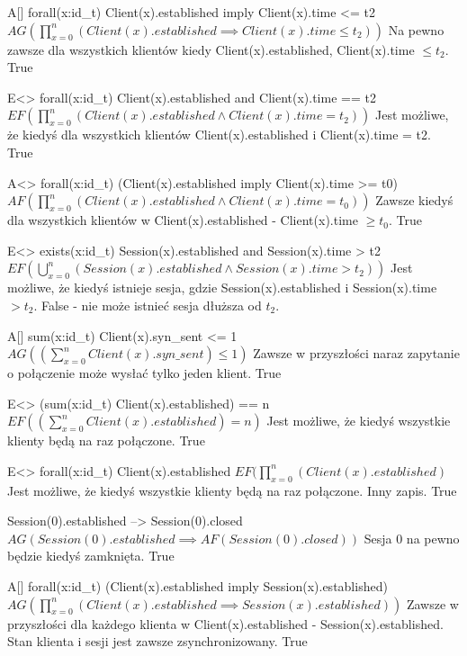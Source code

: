 \documentclass[12pt, a4paper]{article}
\begin{document}
\fm
{A[] forall(x:id\_t) Client(x).established imply Client(x).time <= t2}
{$AG(\prod\limits_{x=0}^n (Client(x).established \implies Client(x).time \le t_2))$}
{Na pewno zawsze dla wszystkich klientów kiedy Client(x).established, Client(x).time $\le t_2$.}
{True}

\fm
{E<> forall(x:id\_t) Client(x).established and Client(x).time == t2}
{$EF(\prod\limits_{x=0}^n (Client(x).established \wedge Client(x).time = t_2))$}
{Jest możliwe, że kiedyś dla wszystkich klientów Client(x).established i Client(x).time = t2.}
{True}

\clearpage

\fm
{A<> forall(x:id\_t) (Client(x).established imply Client(x).time >= t0)}
{$AF(\prod\limits_{x=0}^n (Client(x).established \wedge Client(x).time = t_0))$}
{Zawsze kiedyś dla wszystkich klientów w Client(x).established - Client(x).time $\ge t_0$.}
{True}

\fm
{E<> exists(x:id\_t) Session(x).established and Session(x).time > t2}
{$EF(\bigcup\limits_{x=0}^n (Session(x).established \wedge Session(x).time > t_2))$}
{Jest możliwe, że kiedyś istnieje sesja, gdzie Session(x).established i Session(x).time $> t_2$.}
{False - nie może istnieć sesja dłuższa od $t_2$.}

\clearpage

\fm
{A[] sum(x:id\_t) Client(x).syn\_sent <= 1}
{$AG((\sum\limits_{x=0}^n Client(x).syn\_sent) \le 1)$}
{Zawsze w przyszłości naraz zapytanie o połączenie może wysłać tylko jeden klient.}
{True}

\fm
{E<> (sum(x:id\_t) Client(x).established) == n}
{$EF((\sum\limits_{x=0}^n Client(x).established) = n)$}
{Jest możliwe, że kiedyś wszystkie klienty będą na raz połączone.}
{True}
\clearpage

\fm
{E<> forall(x:id\_t) Client(x).established}
{$EF(\prod\limits_{x=0}^n (Client(x).established)$}
{Jest możliwe, że kiedyś wszystkie klienty będą na raz połączone. Inny zapis.}
{True}

\fm
{Session(0).established --> Session(0).closed}
{$AG(Session(0).established \implies AF(Session(0).closed))$}
{Sesja 0 na pewno będzie kiedyś zamknięta.}
{True}
\clearpage

\fm
{A[] forall(x:id\_t) (Client(x).established imply Session(x).established)}
{$AG(\prod\limits_{x=0}^n (Client(x).established \implies Session(x).established))$}
{Zawsze w przyszłości dla każdego klienta w Client(x).established - Session(x).established. Stan klienta i sesji jest zawsze zsynchronizowany.}
{True}
\end{document}
